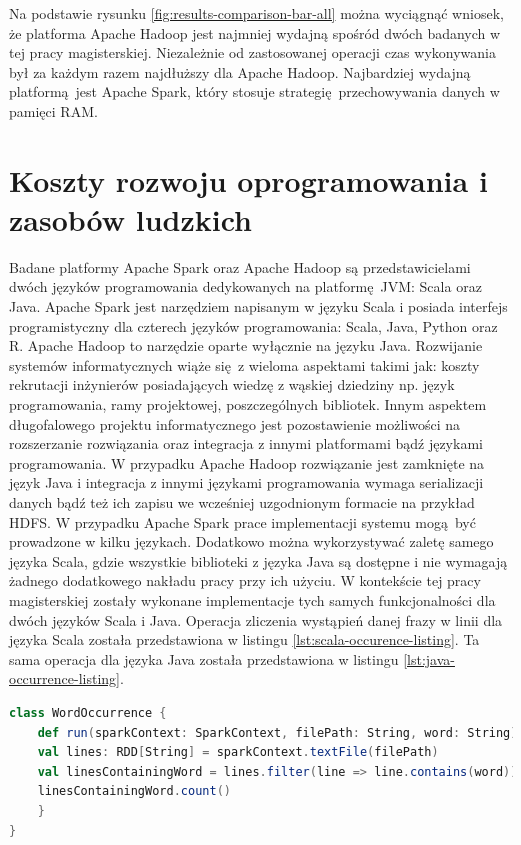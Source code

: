 Na podstawie rysunku \ref{fig:results-comparison-bar-all} można wyciągnąć wniosek, że platforma Apache Hadoop jest najmniej wydajną spośród dwóch badanych w tej pracy magisterskiej. Niezależnie od zastosowanej operacji czas wykonywania był za każdym razem najdłuższy dla Apache Hadoop. Najbardziej wydajną platformą jest Apache Spark, który stosuje strategię przechowywania danych w pamięci RAM.    
\section{Koszty rozwoju oprogramowania i zasobów ludzkich}\label{development_human_resources}
Badane platformy Apache Spark oraz Apache Hadoop są przedstawicielami dwóch języków programowania dedykowanych na platformę JVM: Scala oraz Java. Apache Spark jest narzędziem napisanym w języku Scala i posiada interfejs programistyczny dla czterech języków programowania: Scala, Java, Python oraz R. Apache Hadoop to narzędzie oparte wyłącznie na języku Java. Rozwijanie systemów informatycznych wiąże się z wieloma aspektami takimi jak: koszty rekrutacji inżynierów posiadających wiedzę z wąskiej dziedziny np. język programowania, ramy projektowej, poszczególnych bibliotek. Innym aspektem długofalowego projektu informatycznego jest pozostawienie możliwości na rozszerzanie rozwiązania oraz integracja z innymi platformami bądź językami programowania. W przypadku Apache Hadoop rozwiązanie jest zamknięte na język Java i integracja z innymi językami programowania wymaga serializacji danych bądź też ich zapisu we wcześniej uzgodnionym formacie na przykład HDFS. W przypadku Apache Spark prace implementacji systemu mogą być prowadzone w kilku językach. Dodatkowo można wykorzystywać zaletę samego języka Scala, gdzie wszystkie biblioteki z języka Java są dostępne i nie wymagają żadnego dodatkowego nakładu pracy przy ich użyciu. W kontekście tej pracy magisterskiej zostały wykonane implementacje tych samych funkcjonalności dla dwóch języków Scala i Java. Operacja zliczenia wystąpień danej frazy w linii dla języka Scala została przedstawiona w listingu \ref{lst:scala-occurence-listing}. Ta sama operacja dla języka Java została przedstawiona w listingu \ref{lst:java-occurrence-listing}.
\begin{lstlisting}[language=scala, caption={Operacja zliczania wystąpień danej frazy w linii dla języka Scala na platformie Apache Spark},captionpos=b, label={lst:scala-occurence-listing}]
class WordOccurrence {
	def run(sparkContext: SparkContext, filePath: String, word: String) = {
	val lines: RDD[String] = sparkContext.textFile(filePath)
	val linesContainingWord = lines.filter(line => line.contains(word))
	linesContainingWord.count()
	}
}
\end{lstlisting}
